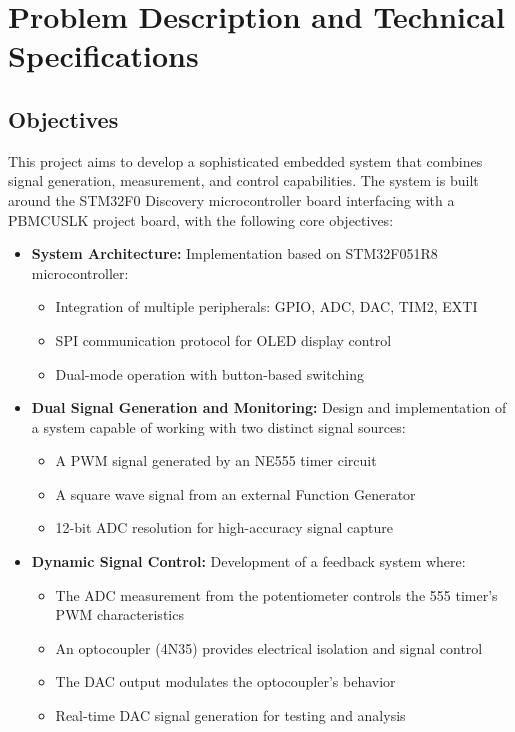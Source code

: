 \section{Problem Description and Technical Specifications}\label{sec:problem-descr}

\subsection{Objectives}
This project aims to develop a sophisticated embedded system that combines signal generation, measurement, and control capabilities. The system is built around the STM32F0 Discovery microcontroller board interfacing with a PBMCUSLK project board, with the following core objectives:

\begin{itemize}[leftmargin=2em]
    \item \textbf{System Architecture:} Implementation based on STM32F051R8 microcontroller:
    \begin{itemize}
        \item Integration of multiple peripherals: GPIO, ADC, DAC, TIM2, EXTI
        \item SPI communication protocol for OLED display control
        \item Dual-mode operation with button-based switching
    \end{itemize}
    
    \item \textbf{Dual Signal Generation and Monitoring:} Design and implementation of a system capable of working with two distinct signal sources:
    \begin{itemize}
        \item A PWM signal generated by an NE555 timer circuit \cite{ne555-timer-datasheet}
        \item A square wave signal from an external Function Generator
        \item 12-bit ADC resolution for high-accuracy signal capture
    \end{itemize}
    
    \item \textbf{Dynamic Signal Control:} Development of a feedback system where:
    \begin{itemize}
        \item The ADC measurement from the potentiometer controls the 555 timer's PWM characteristics
        \item An optocoupler (4N35) provides electrical isolation and signal control \cite{4n35-datasheet}
        \item The DAC output modulates the optocoupler's behavior
        \item Real-time DAC signal generation for testing and analysis
    \end{itemize}
    

\end{itemize}
